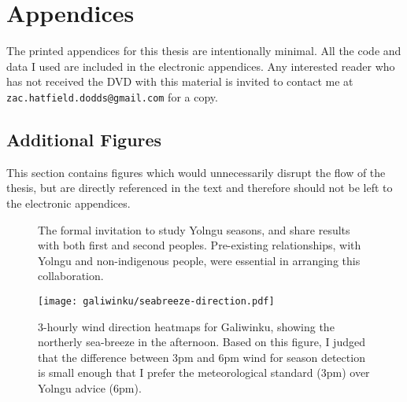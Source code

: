 \chapter{Appendices}
\label{ch:appendices}

The printed appendices for this thesis are intentionally minimal.
All the code and data I used are included in the electronic appendices.
Any interested reader who has not received the DVD with this material is
invited to contact me at \texttt{zac.hatfield.dodds@gmail.com} for a copy.


\section*{Additional Figures}
This section contains figures which would unnecessarily disrupt the
flow of the thesis, but are directly referenced in the text and therefore
should not be left to the electronic appendices.


\begin{figure}[p]
    \centering
    \caption[Letter of invitation for collaborative research]{
        The formal invitation to study Yolngu seasons,
        and share results with both first and second peoples.
        Pre-existing relationships, with Yolngu and non-indigenous people,
        were essential in arranging this collaboration.
        }
    \label{app:invitation-letter}
\end{figure}

\begin{figure}[p]
    \centering
    \texttt{[image: galiwinku/seabreeze-direction.pdf]}
    \caption[3-hourly wind direction heatmaps, Galiwinku]{
        3-hourly wind direction heatmaps for Galiwinku,
        showing the northerly sea-breeze in the afternoon.
        Based on this figure, I judged that the difference between
        3pm and 6pm wind for season detection is small enough that
        I prefer the meteorological standard (3pm) over Yolngu advice (6pm).}
    \label{fig:galiwinku-seabreeze-direction}
\end{figure}
